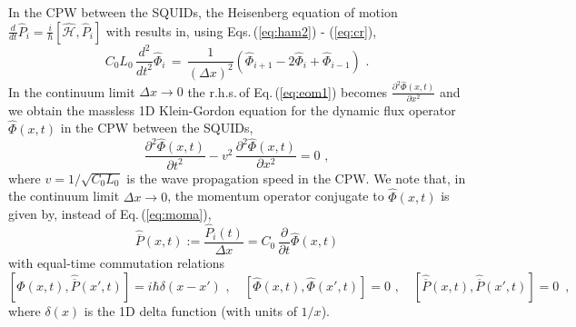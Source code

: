 %
In the CPW between the SQUIDs, the Heisenberg equation of motion 
$\displaystyle \frac{d}{dt} \hat{P}_i = \frac{i}{\hbar} \left[\hat{\mathcal{H}}, \hat{P}_i \right]$ 
with results in, using Eqs.\,(\ref{eq:ham2}) - (\ref{eq:cr}), 
%
\begin{equation} \label{eq:eom1}
C_0 L_0 \, \frac{d^2}{dt^2} \hat{\Phi}_i \, = \, 
\frac{1}{(\Delta x)^2} \left(\hat{\Phi}_{i+1} - 2 \hat{\Phi}_i +  \hat{\Phi}_{i-1} \right) \, \, .
\end{equation}
%
In the continuum limit $\Delta x \to 0$ the r.h.s.\,of Eq.\,(\ref{eq:eom1}) becomes
$\displaystyle \frac{\partial^2\hat{\Phi}(x,t)}{\partial x^2}$
and we obtain the massless 1D Klein-Gordon equation 
for the dynamic flux operator $\hat{\Phi}(x,t)$ in the CPW between the SQUIDs,
%
\begin{equation} \label{eq:eom2}
\frac{\partial^2\hat{\Phi}(x,t)}{\partial t^2} - v^2 \, \frac{\partial^2\hat{\Phi}(x,t)}{\partial x^2} = 0 \, \, ,
\end{equation}
%
where $v = 1 / \sqrt{C_0 L_0}$ is the wave propagation speed in the CPW.
We note that, in the continuum limit $\Delta x \to 0$, 
the momentum operator conjugate to $\hat{\Phi}(x,t)$ is given by,
instead of Eq.\,(\ref{eq:moma}), 
%
\begin{equation} \label{eq:mom2} 
\hat{\overline{P}}(x,t) := \frac{\hat{P}_{i}(t)}{\Delta x} = 
C_0 \, \frac{\partial}{\partial t} \hat{\Phi}(x,t)
\end{equation}
%
with equal-time commutation relations
%
\begin{equation} \label{eq:cr2} 
\left[\hat{\Phi}(x,t), \hat{\overline{P}}(x',t) \right] = i \hbar \delta(x - x') \, \, , \quad 
\left[\hat{\Phi}(x,t), \hat{\Phi}(x',t) \right] = 0 \, \, , \quad 
\left[\hat{\overline{P}}(x,t), \hat{\overline{P}}(x',t) \right] = 0 \, \, \, , 
\end{equation}
%
where $\delta(x)$ is the 1D delta function (with units of $1/x$).






